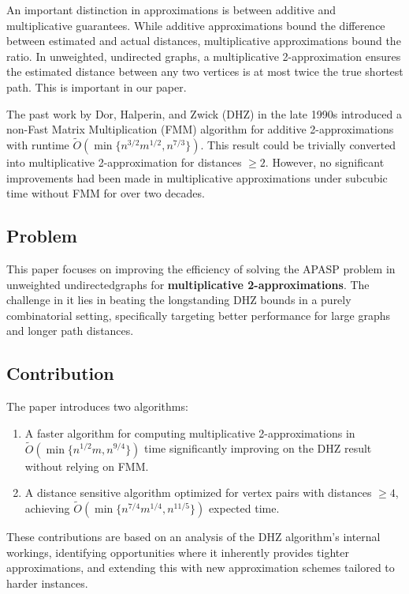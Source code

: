 \documentclass[a4paper,11pt,oneside]{book}
\begin{document}
An important distinction in approximations is between additive and multiplicative guarantees. While additive approximations bound the difference between estimated and actual distances, multiplicative approximations bound the ratio. In unweighted, undirected graphs, a multiplicative 2-approximation ensures the estimated distance between any two vertices is at most twice the true shortest path. This is important in our paper.

The past work by Dor, Halperin, and Zwick (DHZ) in the late 1990s introduced a non-Fast Matrix Multiplication (FMM) algorithm for additive 2-approximations with runtime $\tilde{O}(\min\{n^{3/2}m^{1/2}, n^{7/3}\})$. This result could be trivially converted into multiplicative 2-approximation for distances $\geq 2$. However, no significant improvements had been made in multiplicative approximations under subcubic time without FMM for over two decades.

\subsection*{Problem}
This paper focuses on improving the efficiency of solving the APASP problem in unweighted undirectedgraphs for \textbf{multiplicative 2-approximations}. The challenge in it lies in beating the longstanding DHZ bounds in a purely combinatorial setting, specifically targeting better performance for large graphs and longer path distances.

\subsection*{Contribution}
The paper introduces two algorithms:

\begin{enumerate}
    \item A faster algorithm for computing multiplicative 2-approximations in $\tilde{O}(\min\{n^{1/2}m, n^{9/4}\})$ time significantly improving on the DHZ result without relying on FMM.
    \item A distance sensitive algorithm optimized for vertex pairs with distances $\geq 4$, achieving $\tilde{O}(\min\{n^{7/4}m^{1/4}, n^{11/5}\})$ expected time.
\end{enumerate}

These contributions are based on an analysis of the DHZ algorithm’s internal workings, identifying opportunities where it inherently provides tighter approximations, and extending this with new approximation schemes tailored to harder instances.
\end{document}
